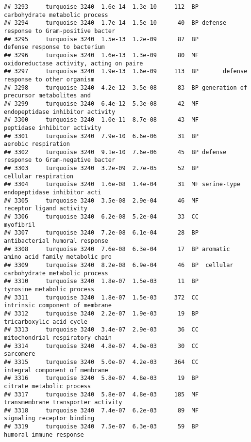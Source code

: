 \documentclass[]{article}
\begin{document}
\begin{verbatim}
## 3293     turquoise 3240  1.6e-14  1.3e-10     112  BP           carbohydrate metabolic process
## 3294     turquoise 3240  1.7e-14  1.5e-10      40  BP defense response to Gram-positive bacter
## 3295     turquoise 3240  1.5e-13  1.2e-09      87  BP            defense response to bacterium
## 3296     turquoise 3240  1.6e-13  1.3e-09      80  MF oxidoreductase activity, acting on paire
## 3297     turquoise 3240  1.9e-13  1.6e-09     113  BP       defense response to other organism
## 3298     turquoise 3240  4.2e-12  3.5e-08      83  BP generation of precursor metabolites and 
## 3299     turquoise 3240  6.4e-12  5.3e-08      42  MF         endopeptidase inhibitor activity
## 3300     turquoise 3240  1.0e-11  8.7e-08      43  MF             peptidase inhibitor activity
## 3301     turquoise 3240  7.9e-10  6.6e-06      31  BP                      aerobic respiration
## 3302     turquoise 3240  9.1e-10  7.6e-06      45  BP defense response to Gram-negative bacter
## 3303     turquoise 3240  3.2e-09  2.7e-05      52  BP                     cellular respiration
## 3304     turquoise 3240  1.6e-08  1.4e-04      31  MF serine-type endopeptidase inhibitor acti
## 3305     turquoise 3240  3.5e-08  2.9e-04      46  MF                 receptor ligand activity
## 3306     turquoise 3240  6.2e-08  5.2e-04      33  CC                                myofibril
## 3307     turquoise 3240  7.2e-08  6.1e-04      28  BP           antibacterial humoral response
## 3308     turquoise 3240  7.6e-08  6.3e-04      17  BP aromatic amino acid family metabolic pro
## 3309     turquoise 3240  8.2e-08  6.9e-04      46  BP  cellular carbohydrate metabolic process
## 3310     turquoise 3240  1.8e-07  1.5e-03      11  BP               tyrosine metabolic process
## 3311     turquoise 3240  1.8e-07  1.5e-03     372  CC          intrinsic component of membrane
## 3312     turquoise 3240  2.2e-07  1.9e-03      19  BP                 tricarboxylic acid cycle
## 3313     turquoise 3240  3.4e-07  2.9e-03      36  CC          mitochondrial respiratory chain
## 3314     turquoise 3240  4.8e-07  4.0e-03      30  CC                                sarcomere
## 3315     turquoise 3240  5.0e-07  4.2e-03     364  CC           integral component of membrane
## 3316     turquoise 3240  5.8e-07  4.8e-03      19  BP                citrate metabolic process
## 3317     turquoise 3240  5.8e-07  4.8e-03     185  MF       transmembrane transporter activity
## 3318     turquoise 3240  7.4e-07  6.2e-03      89  MF               signaling receptor binding
## 3319     turquoise 3240  7.5e-07  6.3e-03      59  BP                  humoral immune response

\end{verbatim}
\end{document}
